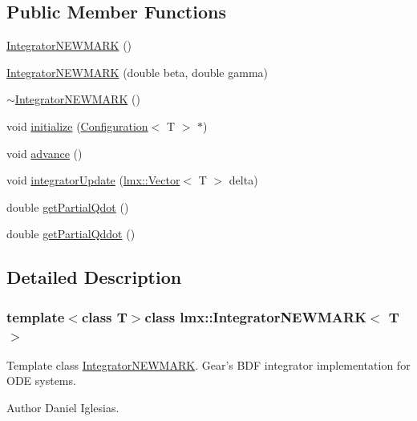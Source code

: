 \subsection*{Public Member Functions}
\begin{DoxyCompactItemize}
\item 
\hyperlink{classlmx_1_1IntegratorNEWMARK_a614551a827b3ed7b7e2af91a6a3cb4d8}{Integrator\-N\-E\-W\-M\-A\-R\-K} ()
\item 
\hyperlink{classlmx_1_1IntegratorNEWMARK_a75cc12a6848df78b87c656447069c5cc}{Integrator\-N\-E\-W\-M\-A\-R\-K} (double beta, double gamma)
\item 
\hyperlink{classlmx_1_1IntegratorNEWMARK_af0fcb3a6122141515aaccf4a207058aa}{$\sim$\-Integrator\-N\-E\-W\-M\-A\-R\-K} ()
\item 
void \hyperlink{classlmx_1_1IntegratorNEWMARK_a2aa5136a1c112e7ac31c2bd3cb516988}{initialize} (\hyperlink{classlmx_1_1Configuration}{Configuration}$<$ T $>$ $\ast$)
\item 
void \hyperlink{classlmx_1_1IntegratorNEWMARK_a8e02bf1560e75a9bfa6c9d47edfe9f86}{advance} ()
\item 
void \hyperlink{classlmx_1_1IntegratorNEWMARK_aec6f86f3fc8a7118e9e7ef49d5aaa9c0}{integrator\-Update} (\hyperlink{classlmx_1_1Vector}{lmx\-::\-Vector}$<$ T $>$ delta)
\item 
double \hyperlink{classlmx_1_1IntegratorNEWMARK_aef69029cf0cac5ce94ac218ffce77864}{get\-Partial\-Qdot} ()
\item 
double \hyperlink{classlmx_1_1IntegratorNEWMARK_ad00ddd433a6b4835c1be9ace78c66f6f}{get\-Partial\-Qddot} ()
\end{DoxyCompactItemize}


\subsection{Detailed Description}
\subsubsection*{template$<$class T$>$class lmx\-::\-Integrator\-N\-E\-W\-M\-A\-R\-K$<$ T $>$}

Template class \hyperlink{classlmx_1_1IntegratorNEWMARK}{Integrator\-N\-E\-W\-M\-A\-R\-K}. Gear's B\-D\-F integrator implementation for O\-D\-E systems. 

\begin{DoxyAuthor}{Author}
Daniel Iglesias. 
\end{DoxyAuthor}


